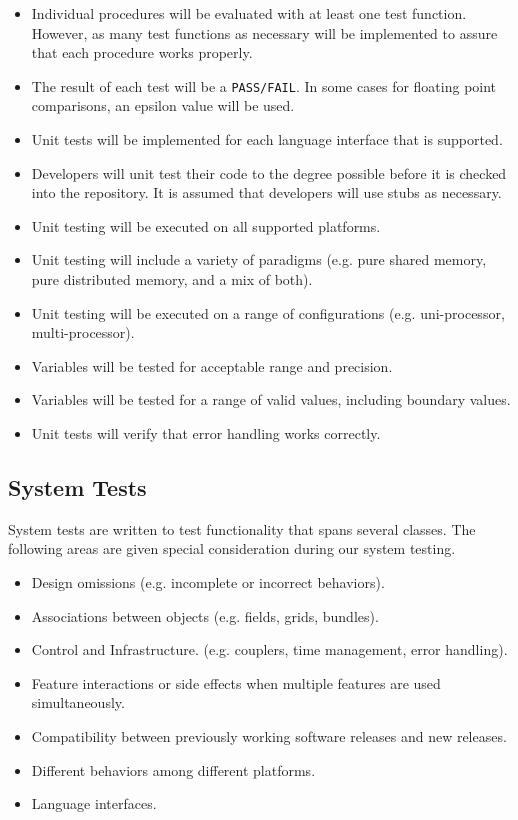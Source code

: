 \begin{itemize}
\item Individual procedures will be evaluated with at least one test function.  However,
as many test functions as necessary will be implemented to assure that 
each procedure works properly.  
\item The result of each test will be a {\tt PASS/FAIL}.  
In some cases for floating point comparisons, an epsilon value will be used.
\item Unit tests will be implemented for each language interface that is 
supported.
\item Developers will unit test their code to the degree possible  
before it is checked into the repository.  It is assumed that 
developers will use stubs as necessary.
\item Unit testing will be executed on all supported platforms.
\item Unit testing will include a variety of paradigms (e.g. pure shared memory,
pure distributed memory, and a mix of both).
\item Unit testing will be executed on a range of configurations (e.g. uni-processor,
multi-processor).
\item Variables will be tested for acceptable range and precision.
\item Variables will be tested for a range of valid values, including boundary
values.
\item Unit tests will verify that error handling works correctly.
\end{itemize}

\subsection{System Tests}

System tests are written to test functionality that spans several 
classes.  The following areas are given special
consideration during our system testing.

\begin{itemize}
\item Design omissions (e.g. incomplete or incorrect behaviors).
\item Associations between objects (e.g. fields, grids, bundles).
\item Control and Infrastructure. (e.g. couplers, time management, error handling).
\item Feature interactions or side effects when multiple features are used
simultaneously.
\item Compatibility between previously working software releases and new releases.
\item Different behaviors among different platforms.
\item Language interfaces.
\end{itemize}


